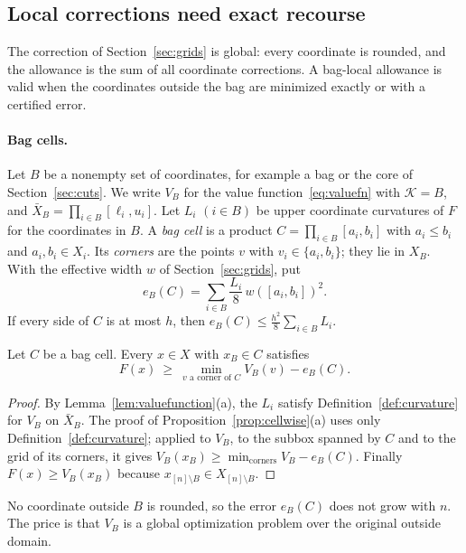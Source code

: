 \subsection{Local corrections need exact recourse}\label{sec:local}
The correction of Section~\ref{sec:grids} is global: every coordinate is
rounded, and the allowance is the sum of all coordinate corrections. A
bag-local allowance is valid when the coordinates outside the bag are
minimized exactly or with a certified error.

\paragraph{Bag cells.}
Let $B$ be a nonempty set of coordinates, for example a bag or the core of
Section~\ref{sec:cuts}. We write $V_B$ for the value
function~\eqref{eq:valuefn} with $\mathcal K=B$, and
$\bar X_B=\prod_{i\in B}[\ell_i,u_i]$. Let $L_i$ $(i\in B)$ be upper
coordinate curvatures of $F$ for the coordinates in $B$. A \emph{bag cell}
is a product $C=\prod_{i\in B}[a_i,b_i]$ with $a_i\le b_i$ and
$a_i,b_i\in X_i$. Its \emph{corners} are the points $v$ with
$v_i\in\{a_i,b_i\}$; they lie in $X_B$. With the effective width $w$ of
Section~\ref{sec:grids}, put
\[
e_B(C)=\sum_{i\in B}\frac{L_i}8\,w([a_i,b_i])^2 .
\]
If every side of $C$ is at most $h$, then $e_B(C)\le\frac{h^2}8\sum_{i\in B}L_i$.

\begin{lemma}\label{lem:cr-cell}
Let $C$ be a bag cell. Every $x\in X$ with $x_B\in C$ satisfies
\[
F(x)\ \ge\ \min_{v\text{ a corner of }C}V_B(v)-e_B(C).
\]
\end{lemma}
\begin{proof}
By Lemma~\ref{lem:valuefunction}(a), the $L_i$ satisfy
Definition~\ref{def:curvature} for $V_B$ on $\bar X_B$. The proof of
Proposition~\ref{prop:cellwise}(a) uses only Definition~\ref{def:curvature};
applied to $V_B$, to the subbox spanned by $C$ and to the grid of its
corners, it gives $V_B(x_B)\ge\min_{\text{corners}}V_B-e_B(C)$. Finally
$F(x)\ge V_B(x_B)$ because $x_{[n]\setminus B}\in X_{[n]\setminus B}$.
\end{proof}

No coordinate outside $B$ is rounded, so the error $e_B(C)$ does not grow
with $n$. The price is that $V_B$ is a global optimization problem over the
original outside domain.

